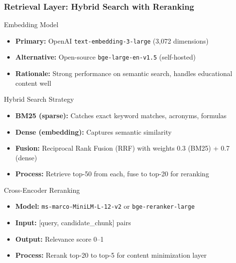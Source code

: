 \documentclass[aspectratio=169]{beamer}
\begin{document}
\begin{frame}
\frametitle{Retrieval Layer: Hybrid Search with Reranking}
\begin{block}{Embedding Model}
\begin{itemize}
\item \textbf{Primary:} OpenAI \texttt{text-embedding-3-large} (3,072 dimensions)
\item \textbf{Alternative:} Open-source \texttt{bge-large-en-v1.5} (self-hosted)
\item \textbf{Rationale:} Strong performance on semantic search, handles educational content well
\end{itemize}
\end{block}

\begin{block}{Hybrid Search Strategy}
\begin{itemize}
\item \textbf{BM25 (sparse):} Catches exact keyword matches, acronyms, formulas
\item \textbf{Dense (embedding):} Captures semantic similarity
\item \textbf{Fusion:} Reciprocal Rank Fusion (RRF) with weights 0.3 (BM25) + 0.7 (dense)
\item \textbf{Process:} Retrieve top-50 from each, fuse to top-20 for reranking
\end{itemize}
\end{block}

\begin{block}{Cross-Encoder Reranking}
\begin{itemize}
\item \textbf{Model:} \texttt{ms-marco-MiniLM-L-12-v2} or \texttt{bge-reranker-large}
\item \textbf{Input:} [query, candidate\_chunk] pairs
\item \textbf{Output:} Relevance score 0--1
\item \textbf{Process:} Rerank top-20 to top-5 for content minimization layer
\end{itemize}
\end{block}
\end{frame}
\end{document}

